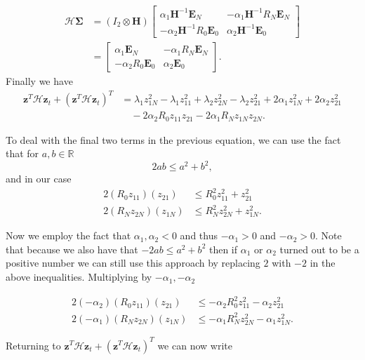 \documentclass[12pt]{article}
\begin{document}
\begin{flushleft}
\begin{align*}
\mathcal{H}\boldsymbol{\Sigma} &=
(I_2 \otimes \boldsymbol{H}) \begin{bmatrix}
\alpha_1 \boldsymbol{H}^{-1} \boldsymbol{E}_N & -\alpha_1 \boldsymbol{H}^{-1} R_N \boldsymbol{E}_N \\
-\alpha_2 \boldsymbol{H}^{-1} R_0 \boldsymbol{E}_0 & \alpha_2\boldsymbol{H}^{-1} \boldsymbol{E}_0
\end{bmatrix}\\
 &= \begin{bmatrix}
\alpha_1 \boldsymbol{E}_N & -\alpha_1 R_N \boldsymbol{E}_N \\
-\alpha_2 R_0 \boldsymbol{E}_0 & \alpha_2 \boldsymbol{E}_0
\end{bmatrix}.
\end{align*}
 Finally we have
\begin{align*}
\mathbf{z}^{T} \mathcal{H} \mathbf{z}_t + (\mathbf{z}^{T}\mathcal{H} \mathbf{z}_t)^{T} &=  \lambda_1 z_{1N}^2 - \lambda_1 z_{11}^2 + \lambda_2 z_{2N}^2 - \lambda_2 z_{21}^2 
+ 2\alpha_1 z_{1N}^2 + 2 \alpha_2 z_{21}^2\\
& \quad - 2\alpha_2 R_0 z_{11}z_{21} - 2\alpha_1 R_N z_{1N}z_{2N}.
\end{align*}

To deal with the final two terms in the previous equation, we can use the fact that for $a,b \in \mathbb{R}$ 
$$2ab \leq a^2 + b^2,$$
and in our case 
\begin{align*}
2 ( R_0 z_{11})(z_{21}) &\leq  R_0^2 z_{11}^2 +  z_{21}^2\\
2 ( R_N z_{2N})(z_{1N}) &\leq  R_N^2 z_{2N}^2 + z_{1N}^2.
\end{align*}

Now we employ the fact that $\alpha_1, \alpha_2 < 0$ and thus $-\alpha_1 > 0$ and $-\alpha_2 >0$. Note that because we also have that $-2ab \leq a^2 +b^2$ then if $\alpha_1$ or $\alpha_2$ turned out to be  a positive number we can still use this approach by replacing $2$ with $-2$ in the above inequalities. Multiplying by $-\alpha_1, -\alpha_2$

\begin{align*}
2(-\alpha_2) ( R_0 z_{11})(z_{21}) &\leq  -\alpha_2 R_0^2 z_{11}^2 -  \alpha_2 z_{21}^2\\
2(-\alpha_1) ( R_N z_{2N})(z_{1N}) &\leq  -\alpha_1 R_N^2 z_{2N}^2 -\alpha_1  z_{1N}^2.
\end{align*} 

Returning to $\mathbf{z}^{T} \mathcal{H} \mathbf{z}_t + (\mathbf{z}^{T}\mathcal{H} \mathbf{z}_t)^{T}$ we can now write


\end{flushleft}
\end{document}
